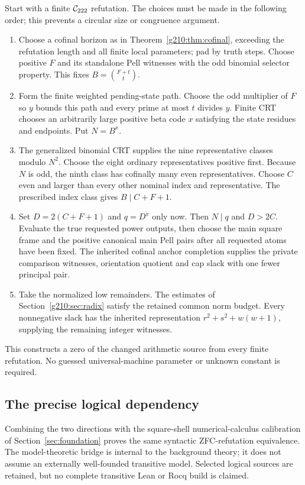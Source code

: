 Start with a finite $\mathcal C_{222}$ refutation. The choices must be made in the
following order; this prevents a circular size or congruence argument.
\begin{enumerate}[leftmargin=*,itemsep=0.35em]
\item Choose a cofinal horizon as in Theorem~\ref{g210:thm:cofinal}, exceeding
the refutation length and all finite local parameters; pad by truth steps.
Choose positive $F$ and its standalone Pell witnesses with the odd binomial
selector property. This fixes $B=\binom{F+t}{t}$.
\item Form the finite weighted pending-state path. Choose the odd multiplier
of $F$ so $y$ bounds this path and every prime at most $t$ divides $y$.
Finite CRT chooses an arbitrarily large positive beta code $x$ satisfying the
state residues and endpoints. Put $N=B^x$.
\item The generalized binomial CRT supplies the nine representative classes
modulo $N^2$. Choose the eight ordinary representatives positive first.
Because $N$ is odd, the ninth class has cofinally many even representatives.
Choose $C$ even and larger than every other nominal index and representative.
The prescribed index class gives $B\mid C+F+1$.
\item Set $D=2(C+F+1)$ and $q=D^x$ only now. Then $N\mid q$ and $D>2C$.
Evaluate the true requested power outputs, then choose the main square frame
and the positive canonical main Pell pairs after all requested atoms have
been fixed. The inherited cofinal anchor
completion supplies the private comparison witnesses, orientation quotient
and cap slack with one fewer principal pair.
\item Take the normalized low remainders. The estimates of
Section~\ref{g210:sec:radix} satisfy the retained common norm budget. Every
nonnegative slack has the inherited representation
$r^2+s^2+w(w+1)$, supplying the remaining integer witnesses.
\end{enumerate}
This constructs a zero of the changed arithmetic source from every finite
refutation. No guessed universal-machine parameter or unknown constant is
required.

\subsection{The precise logical dependency}
Combining the two directions with the square-shell numerical-calculus
calibration of Section~\ref{sec:foundation} proves the same syntactic
ZFC-refutation equivalence. The model-theoretic bridge is internal to the
background theory; it does not assume an externally well-founded transitive
model. Selected logical sources are retained, but no complete transitive
Lean or Rocq build is claimed.
